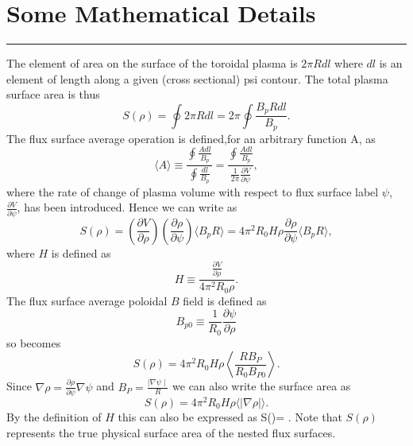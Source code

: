 \boldmath

\section{Some Mathematical Details}

\label{appendix1}
\bigskip
\hrule height2pt
\bigskip
The element of  area on the surface of the toroidal plasma is $ 2 \pi R dl $
where $dl$ is an element of length along a given (cross sectional) psi contour.
The total plasma surface area is thus
\begin{equation}
 S(\rho) =\oint{2 \pi R dl}=2 \pi \oint{\frac{B_{p}Rdl}{B_{p}}}  
 \label{eq:area}.
\end{equation}
The flux surface average operation is defined,for an arbitrary function A, as
\begin{equation}
 \langle A\rangle \equiv \frac{\oint{ \frac{A dl}{B_p}}}{\oint{ \frac{dl}{B_p}}}
 = \frac{\oint{ \frac{A dl}{B_p}}}    {\frac{1}{2 \pi}
 \frac{\partial V}{\partial  \psi} }
 \label{eq:flavg},
\end{equation}
where the rate of change of plasma volume with respect to flux surface label $
\psi$, $\frac{\partial V}{\partial \psi}$, has been introduced. Hence we can
write  as
\begin{equation}
 S(\rho) =\left( \frac{\partial V}{\partial \rho} \right )
 \left( \frac{\partial \rho}{\partial \psi}\right) \langle B_pR\rangle
 =4{\pi}^2R_0H\rho\frac{\partial \rho}{\partial \psi}
 \langle B_pR\rangle    \label{eq:sdef},
\end{equation}
where $ H $ is defined as 
\begin{equation}
 H \equiv \frac{\frac{\partial V}{\partial \rho}}{4\pi^2R_0\rho}
 \label{eq:hdef}.
\end{equation}
The flux surface average poloidal $ B $ field is defined as
\begin{equation}
 B_{p0} \equiv     \frac{1}{R_0} \frac{\partial \psi}{\partial \rho}
 \label{eq:bpdef}
\end{equation}
so  becomes
\begin{equation}
 S(\rho) = 4\pi^2R_0H\rho\left \langle\frac{RB_{P}}{R_0B_{P0}}\right\rangle
 \label{eq:sdef1}.
\end{equation}
Since $\nabla\rho = \frac{\partial \rho}{\partial \psi} \nabla \psi $ and 
$B_P=\frac{\mid\nabla\psi\mid}{R}$ we can also write the surface area  as
\begin{equation}
 S(\rho)=4\pi^2R_0H\rho\langle\mid\nabla\rho\mid\rangle
 \label{eq:sdef3a}.
\end{equation}
By the definition of $ H $ this can also be expressed as
\beq
 S(\rho)=   
 \langle\mid\nabla\rho\mid\rangle
 \label{eq:sdef3}.
\eeq
Note that $ S(\rho) $ represents the true physical surface area of the  nested
flux surfaces. 


